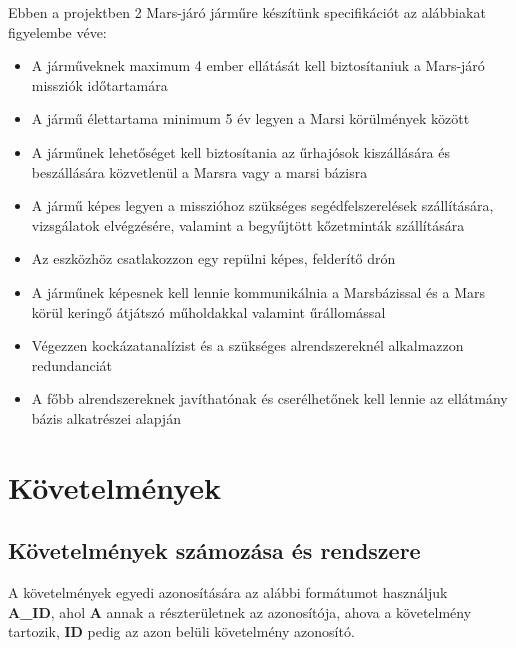 \documentclass[12pt]{report}
\begin{document}
Ebben a projektben 2 Mars-járó járműre készítünk specifikációt az alábbiakat figyelembe véve:
\begin{itemize}
  \item A járműveknek maximum 4 ember ellátását kell biztosítaniuk a Mars-járó missziók
időtartamára
  \item A jármű élettartama minimum 5 év legyen a Marsi körülmények között
  \item A járműnek lehetőséget kell biztosítania az űrhajósok kiszállására és beszállására
közvetlenül a Marsra vagy a marsi bázisra
  \item A jármű képes legyen a misszióhoz szükséges segédfelszerelések szállítására, vizsgálatok
elvégzésére, valamint a begyűjtött kőzetminták szállítására
  \item Az eszközhöz csatlakozzon egy repülni képes, felderítő drón
  \item A járműnek képesnek kell lennie kommunikálnia a Marsbázissal és a Mars körül keringő
átjátszó műholdakkal valamint űrállomással
  \item Végezzen kockázatanalízist és a szükséges alrendszereknél alkalmazzon redundanciát
  \item A főbb alrendszereknek javíthatónak és cserélhetőnek kell lennie az ellátmány bázis
alkatrészei alapján
\end{itemize}

\chapter{Követelmények}
\section{Követelmények számozása és rendszere}
A követelmények egyedi azonosítására az alábbi formátumot használjuk \\ 
\textbf{A_ID}, ahol \textbf{A} annak a részterületnek az azonosítója, ahova a követelmény tartozik, \textbf{ID} pedig az azon belüli követelmény azonosító.
\end{document}
